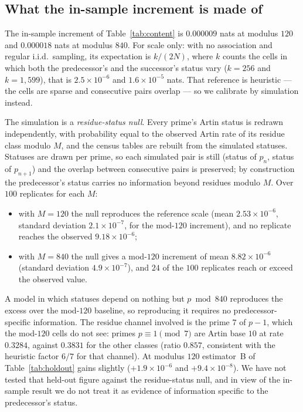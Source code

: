 \documentclass[11pt,reqno]{amsart}
\theoremstyle{plain}
\theoremstyle{definition}
\begin{document}
\subsection*{What the in-sample increment is made of}
The in-sample increment of Table~\ref{tab:content} is $0.000009$ nats at modulus $120$ and
$0.000018$ nats at modulus $840$. For scale only: with no association and regular i.i.d.\
sampling, its expectation is $k/(2N)$, where $k$ counts the cells in which both the
predecessor's and the successor's status vary ($k=256$ and $k=1{,}599$), that is
$2.5\times10^{-6}$ and $1.6\times10^{-5}$ nats. That reference is heuristic --- the cells are
sparse and consecutive pairs overlap --- so we calibrate by simulation instead.

The simulation is a \emph{residue-status null}. Every prime's Artin status is redrawn
independently, with probability equal to the observed Artin rate of its residue class modulo
$M$, and the census tables are rebuilt from the simulated statuses. Statuses are drawn per
prime, so each simulated pair is still (status of $p_n$, status of $p_{n+1}$) and the overlap
between consecutive pairs is preserved; by construction the predecessor's status carries no
information beyond residues modulo $M$. Over $100$ replicates for each $M$:
\begin{itemize}
	\item with $M=120$ the null reproduces the reference scale (mean $2.53\times10^{-6}$, standard
	deviation $2.1\times10^{-7}$, for the mod-$120$ increment), and no replicate reaches the
	observed $9.18\times10^{-6}$;
	\item with $M=840$ the null gives a mod-$120$ increment of mean $8.82\times10^{-6}$ (standard
	deviation $4.9\times10^{-7}$), and $24$ of the $100$ replicates reach or exceed the observed value.
\end{itemize}
A model in which statuses depend on nothing but $p \bmod 840$ reproduces the excess over the
mod-$120$ baseline, so reproducing it requires no predecessor-specific information. The residue channel involved is the
prime $7$ of $p-1$, which the mod-$120$ cells do not see: primes $p\equiv 1 \pmod 7$ are Artin
base $10$ at rate $0.3284$, against $0.3831$ for the other classes (ratio $0.857$, consistent with
the heuristic factor $6/7$ for that channel). At modulus $120$ estimator~B of
Table~\ref{tab:holdout} gains slightly ($+1.9\times10^{-6}$ and $+9.4\times10^{-8}$). We have not
tested that held-out figure against the residue-status null, and in view of the in-sample result
we do not treat it as evidence of information specific to the predecessor's status.
\end{document}
